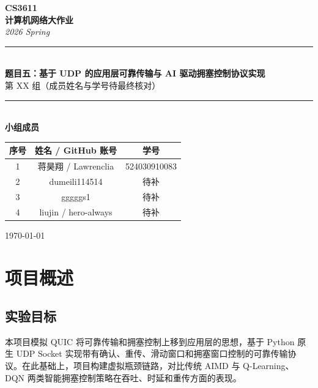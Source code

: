 \documentclass[a4paper, 11pt]{article}
\newcommand{\reporttitle}{题目五：基于 UDP 的应用层可靠传输与 AI 驱动拥塞控制协议实现}
\newcommand{\teamid}{第 XX 组（成员姓名与学号待最终核对）}
\begin{document}
\thispagestyle{empty}
\begin{center}
  \vspace*{2.0cm}
  {\fontsize{28pt}{36pt}\selectfont\bfseries CS3611}\\[8pt]
  {\fontsize{22pt}{30pt}\selectfont\bfseries 计算机网络大作业}\\[10pt]
  {\large\itshape 2026 Spring}\\[1.4cm]
  \noindent\rule{0.66\textwidth}{0.8pt}\\[0.9cm]
  {\LARGE\bfseries \reporttitle}\\[0.8cm]
  {\Large \teamid}\\[1.0cm]
  \noindent\rule{0.66\textwidth}{0.8pt}\\[0.8cm]
  {\large\bfseries 小组成员}\\[0.35cm]
  \begin{tabular}{|c|c|c|}
    \hline
    \textbf{序号} & \textbf{姓名 / GitHub 账号} & \textbf{学号} \\
    \hline
    1 & 蒋昊翔 / Lawrenclia & 524030910083 \\
    \hline
    2 & dumeili114514 & 待补 \\
    \hline
    3 & gggggs1 & 待补 \\
    \hline
    4 & liujin / hero-always & 待补 \\
    \hline
  \end{tabular}
  \vfill
  {\large \today}
  \vspace{1.0cm}
\end{center}
\newpage

\setcounter{page}{1}

\section{项目概述}

\subsection{实验目标}
本项目模拟 QUIC 将可靠传输和拥塞控制上移到应用层的思想，基于 Python 原生 UDP Socket 实现带有确认、重传、滑动窗口和拥塞窗口控制的可靠传输协议。在此基础上，项目构建虚拟瓶颈链路，对比传统 AIMD 与 Q-Learning、DQN 两类智能拥塞控制策略在吞吐、时延和重传方面的表现。
\end{document}
